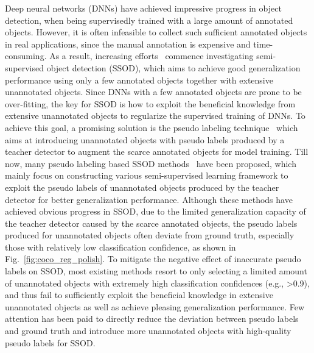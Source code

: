 \documentclass[letterpaper]{article} \usepackage{aaai23}  \usepackage{times}  \usepackage{helvet}  \usepackage{courier}  \usepackage[hyphens]{url}  \usepackage{graphicx} \urlstyle{rm} \def\UrlFont{\rm}  \usepackage{natbib}  \usepackage{caption} \frenchspacing  \setlength{\pdfpagewidth}{8.5in}  \setlength{\pdfpageheight}{11in}  \usepackage{algorithm}
\begin{document}
Deep neural networks (DNNs) have achieved impressive progress in object detection, when being supervisedly trained with a large amount of annotated objects. However, it is often infeasible to collect such sufficient annotated objects in real applications, since the manual annotation is expensive and time-consuming. As a result, increasing efforts~\cite{zhou2021instant,tang2021humble,liu2021unbiased,xu2021end} commence investigating semi-supervised object detection (SSOD), which aims to achieve good generalization performance using only a few annotated objects together with extensive unannotated objects. Since DNNs with a few annotated objects are prone to be over-fitting, the key for SSOD is how to exploit the beneficial knowledge from extensive unannotated objects to regularize the supervised training of DNNs. To achieve this goal, a promising solution is the pseudo labeling technique~\cite{zoph2020rethinking} which aims at introducing unannotated objects with pseudo labels produced by a teacher detector to augment the scarce annotated objects for model training. Till now, many pseudo labeling based SSOD methods~\cite{sohn2020simple,zhou2021instant,tang2021humble,liu2021unbiased,xu2021end} have been proposed, which mainly focus on constructing various semi-supervised learning framework to exploit the pseudo labels of unannotated objects produced by the teacher detector for better generalization performance. Although these methods have achieved obvious progress in SSOD, due to the limited generalization capacity of the teacher detector caused by the scarce annotated objects, the pseudo labels produced for unannotated objects often deviate from ground truth, especially those with relatively low classification confidence, as shown in Fig.~\ref{fig:coco_reg_polish}. To mitigate the negative effect of inaccurate pseudo labels on SSOD, most existing methods resort to only selecting a limited amount of unannotated objects with extremely high classification confidences (e.g., \textgreater0.9), and thus fail to sufficiently exploit the beneficial knowledge in extensive unannotated objects as well as achieve pleasing generalization performance. Few attention has been paid to directly 
reduce the deviation between pseudo labels and ground truth and introduce more unannotated objects with high-quality pseudo labels for SSOD.
\end{document}
